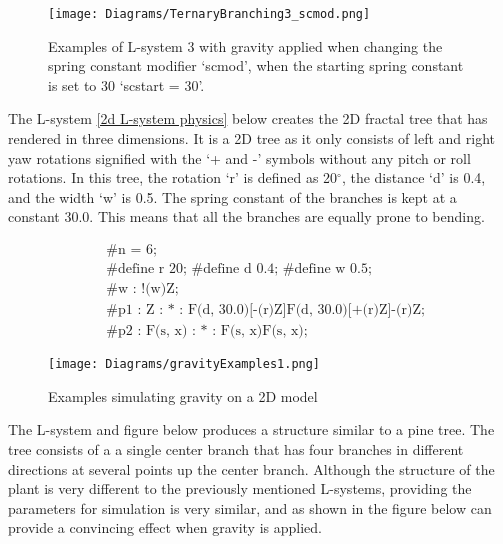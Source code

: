 \begin{figure}[htbp]
	{\centering
		\vspace{7px}
		\texttt{[image: Diagrams/TernaryBranching3\_scmod.png]}
		\caption{Examples of L-system 3 with gravity applied when changing the spring constant modifier `scmod', when the starting spring constant is set to 30 `scstart = 30'.}\label{increasing scmod}
	}
\end{figure}
\FloatBarrier

\noindent
The L-system \ref{2d L-system physics} below creates the 2D fractal tree that has rendered in three dimensions. It is a 2D tree as it only consists of left and right yaw rotations signified with the `+ and -' symbols without any pitch or roll rotations. In this tree, the rotation `r' is defined as 20$^{\circ}$, the distance `d' is 0.4, and the width `w' is 0.5. The spring constant of the branches is kept at a constant 30.0. This means that all the branches are equally prone to bending. 

\begin{singlespace}
\begin{equation} \label{2d L-system physics}
\begin{aligned}
	&\textrm{\#n = 6;} \\
	&\textrm{\#define r 20; \#define d 0.4; \#define w 0.5;}\\
	&\textrm{\#w : !(w)Z;}\\
	&\textrm{\#p1 : Z : * : F(d, 30.0)[-(r)Z]F(d, 30.0)[+(r)Z]-(r)Z;}\\
	&\textrm{\#p2 : F(s, x) : * : F(s, x)F(s, x);}
\end{aligned}
\end{equation}
\end{singlespace}

\begin{figure}[htbp]
	{\centering
		\vspace{7px}
		\texttt{[image: Diagrams/gravityExamples1.png]}
		\label{3DAxisFigure} \label{Gravity applied to generated model 1}
		\caption{Examples simulating gravity on a 2D model}
	}
\end{figure}
\FloatBarrier

\noindent
The L-system and figure below produces a structure similar to a pine tree. The tree consists of a a single center branch that has four branches in different directions at several points up the center branch. Although the structure of the plant is very different to the previously mentioned L-systems, providing the parameters for simulation is very similar, and as shown in the figure below can provide a convincing effect when gravity is applied.

